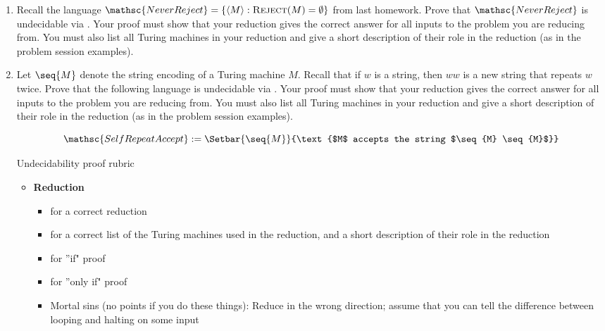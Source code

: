 \documentclass[11pt]{article}
\begin{document}

\begin{enumerate}


\item 
Recall the language $\mathsc{NeverReject} = \{ \langle M \rangle :
\textsc{Reject}(M) = \emptyset \}$ from last homework. 
 Prove that $\mathsc{NeverReject}$ is undecidable via .
 Your proof must show that your reduction gives the correct answer for all inputs to the problem you are reducing from.
 You must also list all Turing machines in your reduction and give a short description of their role in the reduction (as in the problem session examples).

\item
Let $\seq{M}$ denote the string encoding of a Turing machine $M$. Recall that if
$w$ is a string, then $ww$ is a new string that repeats $w$ twice.  Prove that
the following language is undecidable via . 
 Your proof must show that your reduction gives the correct answer for all inputs to the problem you are reducing from.
 You must also list all Turing machines in your reduction and give a short description of their role in the reduction (as in the problem session examples).

\[
	\mathsc{SelfRepeatAccept} 
	:=
	\Setbar{\seq{M}}{\text{$M$ accepts the string $\seq{M} \seq{M}$}}
\]

\begin{Rubric}{Undecidability proof rubric}~

\begin{itemize}

\item \textbf{Reduction}
\begin{itemize}
\item[+ 3] for a correct reduction
\item[+1] for a correct list of the Turing machines used in the reduction, and a short description of their role in the reduction
\item[+ 3] for ''if" proof
\item[+ 3] for ''only if" proof
\item Mortal sins (no points if you do these things): Reduce in the wrong direction; assume that you can tell the difference between looping and halting on some input
\end{itemize}


\end{itemize}
\end{Rubric}
\end{enumerate}
\end{document}
